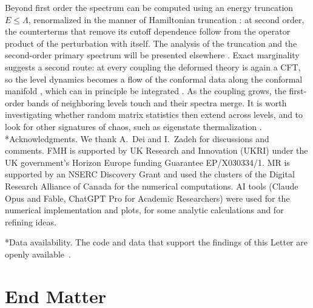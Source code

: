 \documentclass[aps,twocolumn,preprintnumbers,groupedaddress,nofootinbib,prl]{revtex4-2}
\makeatletter
\renewcommand\paragraph{\@startsection{paragraph}{4}{\parindent}{\z@}{-1em}{\normalfont\normalsize\bfseries}}
\newcommand{\Lam}{\Lambda}
\makeatother
\begin{document}
Beyond first order the spectrum can be computed using an energy truncation $E\le\Lam$, renormalized in the manner of Hamiltonian truncation \cite{Hogervorst:2014rta,Rychkov:2014eea,Elias-Miro:2017xxf}: at second order, the counterterms that remove its cutoff dependence follow from the operator product of the perturbation with itself. The analysis of the truncation and the second-order primary spectrum will be presented elsewhere \cite{toappear}. Exact marginality suggests a second route: at every coupling the deformed theory is again a CFT, so the level dynamics becomes a flow of the conformal data along the conformal manifold \cite{Pechukas:1983,Yukawa:1985zz}, which can in principle be integrated \cite{Behan:2017mwi}. As the coupling grows, the first-order bands of neighboring levels touch and their spectra merge. It is worth investigating whether random matrix statistics then extend across levels, and to look for other signatures of chaos, such as eigenstate thermalization \cite{Deutsch:1991msp,Srednicki:1994mfb,Lashkari:2016vgj}.\\


\paragraph*{Acknowledgments.}
We thank A.\ Dei and I.\ Zadeh for discussions and comments. FMH is supported by UK Research and Innovation (UKRI) under the UK government's Horizon Europe funding Guarantee EP/X030334/1. MR is supported by an NSERC Discovery Grant and used the clusters of the Digital Research Alliance of Canada for the numerical computations. AI tools (Claude Opus and Fable, ChatGPT Pro for Academic Researchers) were used for the numerical implementation and plots, for some analytic calculations and for refining ideas.

\paragraph*{Data availability.}
The code and data that support the findings of this Letter are openly available~\cite{HaehlRozali:2026code}.

\nocite{Larsen:1999uk,Keller:2011xi,Hartman:2014oaa,Gava:2002xb,Gaberdiel:2015uca,Keller:2019yrr,Guo:2020gxm}




\appendix
\section*{End Matter}
\setcounter{equation}{0}
\renewcommand{\theequation}{A\arabic{equation}}
\end{document}
